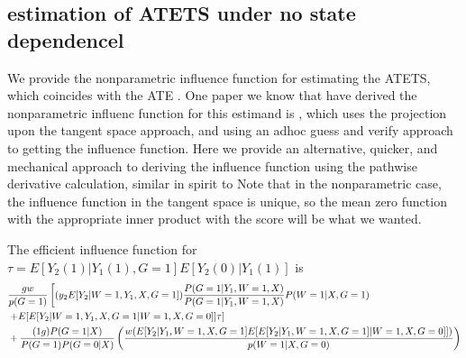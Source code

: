 \documentclass{article}
\begin{document}
\subsection{estimation of ATETS under no state dependencel}
We provide the nonparametric influence function for estimating the ATETS, which coincides with the ATE . One paper we know that have derived the nonparametric influenc function for this estimand is \cite{chen2021semiparametric} , which uses the projection upon the tangent space approach, and using an adhoc guess and verify approach to getting the influence function. Here we provide an alternative, quicker, and mechanical approach to deriving the influence function using the pathwise derivative calculation, similar in spirit to \qu \cite{ichimura2022influence}
Note that in the nonparametric case, the influence function in the tangent space is unique, so the mean zero function with the appropriate inner product with the score will be what we wanted.
\todo 
\begin{theorem} 
    The efficient influence function for $\tau = E[ Y_2(1) | Y_1(1) , G=1]  E[ Y_2(0) | Y_1(1)   ] $ is 
    \begin{align}
        &\frac{ g w }{ p(G=1) } \left[ (y_2  E[ Y_2 | W=1 , Y_1 , X, G =1]  ) \frac{ P( G =1 | Y_1 , W=1 , X ) }{ P(G=1 | Y_1 , W=1 , X ) } P( W=1 | X , G=1)  \right. \\
        &\left.+ E [ E[ Y_2 | W = 1, Y_1 , X, G =1 | W =1, X, G= 0 ] ]  \tau\right] \\
        &+\frac{ (1 g) P(G = 1|X)   }{ P(G= 1) P ( G =0 |X) } \left( \frac{ w ( E [ Y _ 2 | Y_1,W =1 , X, G =1 ]  E [ E[ Y_2 | Y_1, W=1, X, G=1 ] | W =1, X, G= 0 ] ] ) }{ p ( W =1 | X, G =0 ) } \right)
    \end{align}
\end{theorem}
\end{document}

